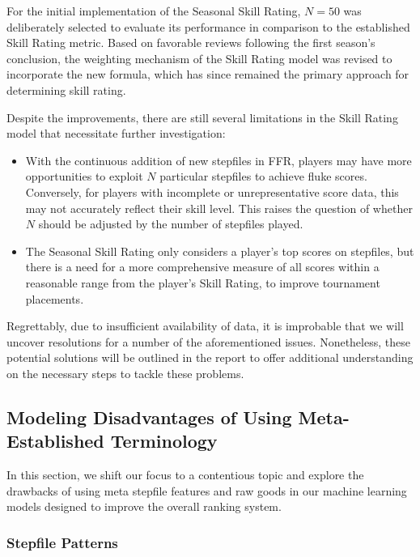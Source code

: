 \vspace{2mm}

For the initial implementation of the Seasonal Skill Rating, $N = 50$ was deliberately selected to evaluate its performance in comparison to the established Skill Rating metric. Based on favorable reviews following the first season's conclusion, the weighting mechanism of the Skill Rating model was revised to incorporate the new formula, which has since remained the primary approach for determining skill rating.
\vspace{2mm}

Despite the improvements, there are still several limitations in the Skill Rating model that necessitate further investigation: 
\begin{itemize}
	\item With the continuous addition of new stepfiles in FFR, players may have more opportunities to exploit $N$ particular stepfiles to achieve fluke scores. Conversely, for players with incomplete or unrepresentative score data, this may not accurately reflect their skill level. This raises the question of whether $N$ should be adjusted by the number of stepfiles played.
	\item The Seasonal Skill Rating only considers a player's top scores on stepfiles, but there is a need for a more comprehensive measure of all scores within a reasonable range from the player's Skill Rating, to improve tournament placements.
	      
\end{itemize}

Regrettably, due to insufficient availability of data, it is improbable that we will uncover resolutions for a number of the aforementioned issues. Nonetheless, these potential solutions will be outlined in the report to offer additional understanding on the necessary steps to tackle these problems.
\subsection{Modeling Disadvantages of Using Meta-Established Terminology}

In this section, we shift our focus to a contentious topic and explore the drawbacks of using meta stepfile features and raw goods in our machine learning models designed to improve the overall ranking system.

\subsubsection{Stepfile Patterns}

